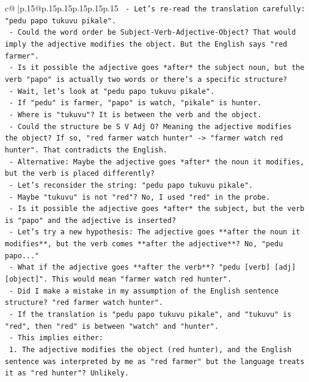 \documentclass{article}
\begin{document}
{\begin{supertabular}{c@{$\;$}|p{.15\linewidth}@{}p{.15\linewidth}p{.15\linewidth}p{.15\linewidth}p{.15\linewidth}p{.15\linewidth}}
{{{\texttt{  {-} Let's re{-}read the translation carefully: "pedu papo tukuvu pikale".} \\
\texttt{  {-} Could the word order be Subject{-}Verb{-}Adjective{-}Object? That would imply the adjective modifies the object. But the English says "red farmer".} \\
\texttt{  {-} Is it possible the adjective goes *after* the subject noun, but the verb "papo" is actually two words or there's a specific structure?} \\
\texttt{  {-} Wait, let's look at "pedu papo tukuvu pikale".} \\
\texttt{  {-} If "pedu" is farmer, "papo" is watch, "pikale" is hunter.} \\
\texttt{  {-} Where is "tukuvu"? It is between the verb and the object.} \\
\texttt{  {-} Could the structure be S V Adj O? Meaning the adjective modifies the object? If so, "red farmer watch hunter" {-}> "farmer watch red hunter". That contradicts the English.} \\
\texttt{  {-} Alternative: Maybe the adjective goes *after* the noun it modifies, but the verb is placed differently?} \\
\texttt{  {-} Let's reconsider the string: "pedu papo tukuvu pikale".} \\
\texttt{  {-} Maybe "tukuvu" is not "red"? No, I used "red" in the probe.} \\
\texttt{  {-} Is it possible the adjective goes *after* the subject, but the verb is "papo" and the adjective is inserted?} \\
\texttt{  {-} Let's try a new hypothesis: The adjective goes **after the noun it modifies**, but the verb comes **after the adjective**? No, "pedu papo..."} \\
\texttt{  {-} What if the adjective goes **after the verb**? "pedu {[}verb{]} {[}adj{]} {[}object{]}". This would mean "farmer watch red hunter".} \\
\texttt{  {-} Did I make a mistake in my assumption of the English sentence structure? "red farmer watch hunter".} \\
\texttt{  {-} If the translation is "pedu papo tukuvu pikale", and "tukuvu" is "red", then "red" is between "watch" and "hunter".} \\
\texttt{  {-} This implies either:} \\
\texttt{    1. The adjective modifies the object (red hunter), and the English sentence was interpreted by me as "red farmer" but the language treats it as "red hunter"? Unlikely.} \\
}}}
\end{supertabular}}
\end{document}
